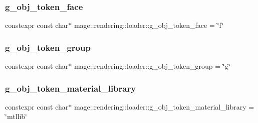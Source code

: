 \hypertarget{namespacemage_1_1rendering_1_1loader_af1e6fc3bc8207ba6113e19e01d513bce}{}\label{namespacemage_1_1rendering_1_1loader_af1e6fc3bc8207ba6113e19e01d513bce} 
\subsubsection{\texorpdfstring{g\+\_\+obj\+\_\+token\+\_\+face}{g\_obj\_token\_face}}
{\footnotesize\ttfamily constexpr const char$\ast$ mage\+::rendering\+::loader\+::g\+\_\+obj\+\_\+token\+\_\+face = \char`\"{}f\char`\"{}}

\hypertarget{namespacemage_1_1rendering_1_1loader_a0357694619e992d57812e2d010c92eaa}{}\label{namespacemage_1_1rendering_1_1loader_a0357694619e992d57812e2d010c92eaa} 
\subsubsection{\texorpdfstring{g\+\_\+obj\+\_\+token\+\_\+group}{g\_obj\_token\_group}}
{\footnotesize\ttfamily constexpr const char$\ast$ mage\+::rendering\+::loader\+::g\+\_\+obj\+\_\+token\+\_\+group = \char`\"{}g\char`\"{}}

\hypertarget{namespacemage_1_1rendering_1_1loader_aeed58b9cd3ff2e1424942b187c652702}{}\label{namespacemage_1_1rendering_1_1loader_aeed58b9cd3ff2e1424942b187c652702} 
\subsubsection{\texorpdfstring{g\+\_\+obj\+\_\+token\+\_\+material\+\_\+library}{g\_obj\_token\_material\_library}}
{\footnotesize\ttfamily constexpr const char$\ast$ mage\+::rendering\+::loader\+::g\+\_\+obj\+\_\+token\+\_\+material\+\_\+library = \char`\"{}mtllib\char`\"{}}

